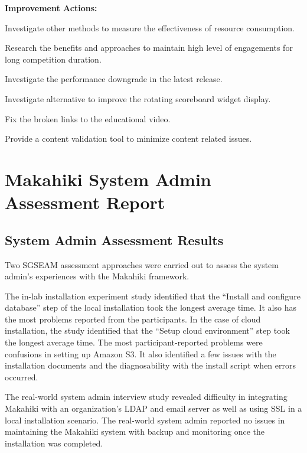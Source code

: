 \begin{table}[ht!]
\begin{shadebox}

{\bf Improvement Actions:}
 \begin{compactenum}
	\item Investigate other methods to measure the effectiveness of resource consumption. 
	\item Research the benefits and approaches to maintain high level of engagements for long competition duration.
	\item Investigate the performance downgrade in the latest release.
	\item Investigate alternative to improve the rotating scoreboard widget display.
	\item Fix the broken links to the educational video.
	\item Provide a content validation tool to minimize content related issues.
\end{compactenum}
\end{shadebox}
\caption{SGSEAM Improvement Action Report from Player Stakeholder's Perspective}

\label{table:player-report}
\end{table}

\section{Makahiki System Admin Assessment Report}

\subsection{System Admin Assessment Results}

Two SGSEAM assessment approaches were carried out to assess the system admin's experiences with the Makahiki framework. 

The in-lab installation experiment study identified that the ``Install and configure database'' step of the local installation took the longest average time. It also has the most problems reported from the participants. In the case of cloud installation, the study identified that the ``Setup cloud environment'' step took the longest average time. The most participant-reported problems were confusions in setting up Amazon S3. It also identified a few issues with the installation documents and the diagnosability with the install script when errors occurred.

The real-world system admin interview study revealed difficulty in integrating Makahiki with an organization's LDAP and email server as well as using SSL in a local installation scenario. The real-world system admin reported no issues in maintaining the Makahiki system with backup and monitoring once the installation was completed.

